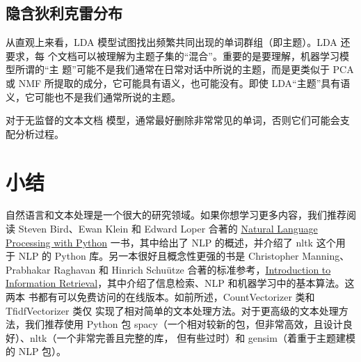 \subsection{隐含狄利克雷分布}
从直观上来看，LDA 模型试图找出频繁共同出现的单词群组（即主题）。LDA 还要求，每
个文档可以被理解为主题子集的“混合”。重要的是要理解，机器学习模型所谓的“主
题”可能不是我们通常在日常对话中所说的主题，而是更类似于 PCA 或 NMF 所提取的成分，它可能具有语义，也可能没有。即使 LDA“主题”具有语义，它可能也不是我们通常所说的主题。

对于无监督的文本文档
模型，通常最好删除非常常见的单词，否则它们可能会支配分析过程。
\section{小结}
自然语言和文本处理是一个很大的研究领域。如果你想学习更多内容，我们推荐阅读 Steven Bird、Ewan Klein 和 Edward
Loper 合著的 \href{http://shop.oreilly.com/product/9780596516499.do}{Natural Language Processing with Python} 一书，其中给出了 NLP 的概述，并介绍了 nltk 这个用
于 NLP 的 Python 库。另一本很好且概念性更强的书是 Christopher Manning、Prabhakar
Raghavan 和 Hinrich Schuütze 合著的标准参考，\href{http://nlp.stanford.edu/IR-book/}{Introduction to Information Retrieval}，其中介绍了信息检索、NLP 和机器学习中的基本算法。这两本
书都有可以免费访问的在线版本。如前所述，CountVectorizer 类和 TfidfVectorizer 类仅
实现了相对简单的文本处理方法。对于更高级的文本处理方法，我们推荐使用 Python 包
spacy（一个相对较新的包，但非常高效，且设计良好）、nltk（一个非常完善且完整的库，
但有些过时）和 gensim（着重于主题建模的 NLP 包）。